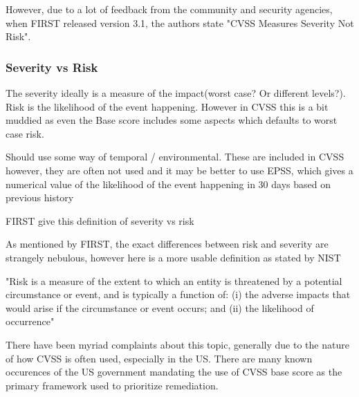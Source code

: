 \documentclass[12pt]{article}
\begin{document}

However, due to a lot of feedback from the community and security agencies, when FIRST released
version 3.1, the authors state "CVSS Measures Severity Not Risk".

\subsubsection*{Severity vs Risk}

The severity ideally is a measure of the impact(worst case? Or different levels?). Risk is the
likelihood of the event happening. However in CVSS this is a bit muddied as even the Base score
includes some aspects which defaults to worst case risk.

Should use some way of temporal / environmental. These are included in CVSS however, they are often
not used and it may be better to use EPSS, which gives a numerical value of the likelihood of the
event happening in 30 days based on previous history

FIRST give this definition of severity vs risk
\textit{}


As mentioned by FIRST, the exact differences between risk and severity are strangely nebulous,
however here is a more usable definition as stated by NIST

"Risk is a measure of the extent to which an entity is threatened by a potential circumstance or event, and is
typically a function of: (i) the adverse impacts that would arise if the circumstance or event occurs; and (ii) the
likelihood of occurrence"

There have been myriad complaints about this topic, generally due to the nature of how CVSS is often
used, especially in the US. There are many known occurences of the US government mandating the use
of CVSS base score as the primary framework used to prioritize remediation.
\end{document}
